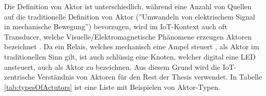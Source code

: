 \begin{table}[H]
\centering
{}
\caption{Typen von Aktoren}
\label{tab:typesOfActutors}
\end{table}

Die Definition von Aktor ist unterschiedlich, während eine Anzahl von Quellen auf die traditionelle Definition von Aktor (''Umwandeln von elektrischem Signal in mechanische Bewegung'') bevorzugen, wird im \ac{IoT}-Kontext auch oft Transducer, welche Visuelle/Elektromagnetische Phänomene erzeugen Aktoren bezeichnet \cite{Dunko2006reference}. Da ein Relais, welches mechanisch eine Ampel steuert \cite{salarian2012coordination}, als Aktor im traditionellen Sinn gilt, ist auch schlüssig eine Knoten, welcher digital eine LED ansteuert, auch als Aktor zu bezeichnen. Aus diesem Grund wird die \ac{IoT}-zentrische Verständnis von Aktoren für den Rest der Thesis verwendet. In Tabelle \ref{tab:typesOfActutors} ist eine Liste mit Beispielen von Aktor-Typen. 

